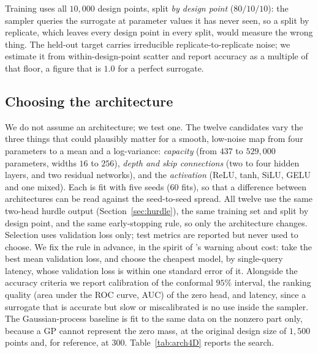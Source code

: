 \documentclass[sn-basic,iicol,pdflatex]{sn-jnl}
\begin{document}
Training uses all $10{,}000$ design points, split \emph{by design point}
($80/10/10$): the sampler queries the surrogate at parameter values it has never
seen, so a split by replicate, which leaves every design point in every split,
would measure the wrong thing. The held-out target carries irreducible
replicate-to-replicate noise; we estimate it from within-design-point scatter
and report accuracy as a multiple of that floor, a figure that is $1.0$ for a
perfect surrogate.

\subsection{Choosing the architecture}
\label{sec:arch4D}

We do not assume an architecture; we test one. The twelve candidates vary the three things that
could plausibly matter for a smooth, low-noise map from four parameters to a mean and a log-variance:
\emph{capacity} (from $437$ to $529{,}000$ parameters, widths $16$ to $256$), \emph{depth and skip
connections} (two to four hidden layers, and two residual networks), and the \emph{activation}
(ReLU, tanh, SiLU, GELU and one mixed). Each is fit with five seeds ($60$ fits), so that a
difference between architectures can be read against the seed-to-seed spread. All twelve use the
same two-head hurdle output (Section~\ref{sec:hurdle}), the same training set and split by design
point, and the same early-stopping rule, so only the architecture changes. Selection uses
validation loss only; test metrics are reported but never used to choose. We
fix the rule in advance, in the spirit of \citeauthor{lu2023}'s warning about cost: take the best mean validation
loss, and choose the cheapest model, by single-query latency, whose validation loss is within one
standard error of it. Alongside the accuracy criteria we report calibration of the conformal $95\%$ interval, the
ranking quality (area under the ROC curve, AUC) of the zero head, and latency, since a surrogate that is accurate but slow or
miscalibrated is no use inside the sampler. The Gaussian-process baseline is fit to the same data on the nonzero part only, because a GP cannot
represent the zero mass, at the original design size of $1{,}500$ points and, for reference, at $300$. Table~\ref{tab:arch4D} reports the search.

\begin{table}[!t]
\centering
\caption{Architecture search on held-out design points, five seeds each
(mean $\pm$ s.d.). Accuracy is test MSE as a multiple of the irreducible noise
floor ($1.0$ is perfect); coverage is of the conformal-calibrated $95\%$ interval;
AUC is of the zero head. Latency is a single query; the last column is a batch of
$10^5$. The chosen model is in bold. The GP baseline models $\log_{10}\bar d$ on
nonzero rows only.}
\label{tab:arch4D}
\small
\footnotesize\setlength{\tabcolsep}{3pt}

\end{table}
\end{document}
